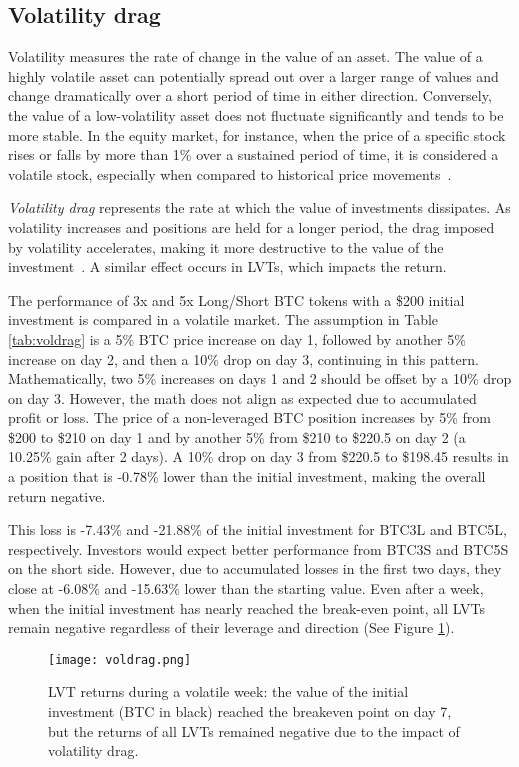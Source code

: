 \subsection{Volatility drag}\label{appx:voldrag}
Volatility measures the rate of change in the value of an asset. The value of a highly volatile asset can potentially spread out over a larger range of values and change dramatically over a short period of time in either direction. Conversely, the value of a low-volatility asset does not fluctuate significantly and tends to be more stable. In the equity market, for instance, when the price of a specific stock rises or falls by more than 1\% over a sustained period of time, it is considered a volatile stock, especially when compared to historical price movements~\cite{Investo_Volatility}.

\textsl{Volatility drag} represents the rate at which the value of investments dissipates. As volatility increases and positions are held for a longer period, the drag imposed by volatility accelerates, making it more destructive to the  value of the investment~\cite{tsalikis2019can, SeekingAlpha_Volatility}. A similar effect occurs in LVTs, which impacts the return.


\begin{example}
	The performance of 3x and 5x Long/Short BTC tokens with a \$200 initial investment is compared in a volatile market. The assumption in Table \ref{tab:voldrag} is a 5\% BTC price increase on day 1, followed by another 5\% increase on day 2, and then a 10\% drop on day 3, continuing in this pattern. Mathematically, two 5\% increases on days 1 and 2 should be offset by a 10\% drop on day 3. However, the math does not align as expected due to accumulated profit or loss. The price of a non-leveraged BTC position increases by 5\% from \$200 to \$210 on day 1 and by another 5\% from \$210 to \$220.5 on day 2 (a 10.25\% gain after 2 days). A 10\% drop on day 3 from \$220.5 to \$198.45 results in a position that is -0.78\% lower than the initial investment, making the overall return negative. 
	
	This loss is -7.43\% and -21.88\% of the initial investment for BTC3L and BTC5L, respectively. Investors would expect better performance from BTC3S and BTC5S on the short side. However, due to accumulated losses in the first two days, they close at -6.08\% and -15.63\% lower than the starting value. Even after a week, when the initial investment has nearly reached the break-even point, all LVTs remain negative regardless of their leverage and direction (See Figure \ref{fig:voldrag}).
	
	\begin{figure}[t]
		\centering
		\texttt{[image: voldrag.png]}
		\caption[Volatility drag effect in volatile market]{LVT returns during a volatile week: the value of the initial investment (BTC in black) reached the breakeven point on day 7, but the returns of all LVTs remained negative due to the impact of volatility drag.}
		\label{fig:voldrag}
	\end{figure}
\end{example}

